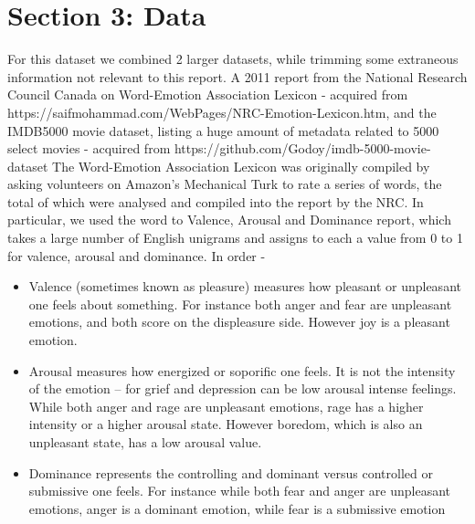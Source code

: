 \documentclass[10pt,a4paper]{article}
\begin{document}
    \section{Section 3: Data}

    For this dataset we combined 2 larger datasets, while trimming some extraneous information not relevant to this report. A 2011 report from the National Research Council Canada on Word-Emotion Association Lexicon - acquired from https://saifmohammad.com/WebPages/NRC-Emotion-Lexicon.htm, and the IMDB5000 movie dataset, listing a huge amount of metadata related to 5000 select movies - acquired from https://github.com/Godoy/imdb-5000-movie-dataset
    \newline \newline
    The Word-Emotion Association Lexicon was originally compiled by asking volunteers on Amazon's Mechanical Turk to rate a series of words, the total of which were analysed and compiled into the report by the NRC. In particular, we used the word to Valence, Arousal and Dominance report, which takes a large number of English unigrams and assigns to each a value from 0 to 1 for valence, arousal and dominance. In order -

    \begin{itemize}
        \item Valence (sometimes known as pleasure) measures how pleasant or unpleasant one feels about something. For instance both anger and fear are unpleasant emotions, and both score on the displeasure side. However joy is a pleasant emotion.
        \item Arousal measures how energized or soporific one feels. It is not the intensity of the emotion -- for grief and depression can be low arousal intense feelings. While both anger and rage are unpleasant emotions, rage has a higher intensity or a higher arousal state. However boredom, which is also an unpleasant state, has a low arousal value.
        \item Dominance represents the controlling and dominant versus controlled or submissive one feels. For instance while both fear and anger are unpleasant emotions, anger is a dominant emotion, while fear is a submissive emotion
    \end{itemize}
\end{document}
